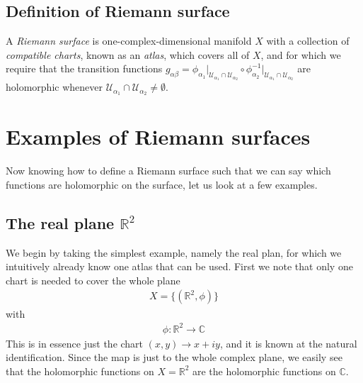 \documentclass[lettersize,11pt]{article}
\begin{document}
\subsection{Definition of Riemann surface \cite{Farkas}}
A \textit{Riemann surface} is one-complex-dimensional manifold $X$ with a collection of \textit{compatible charts}, known as an \textit{atlas}, which covers all of $X$, and for which we require that the transition functions $g_{\alpha\beta}=\phi_{\alpha_1}\big|_{\mathcal{U}_{\alpha_1}\cap \mathcal{U}_{\alpha_2}}\circ \phi_{\alpha_2}^{-1}\big|_{\mathcal{U}_{\alpha_1}\cap \mathcal{U}_{\alpha_2}}$ are holomorphic whenever $\mathcal{U}_{\alpha_1}\cap \mathcal{U}_{\alpha_2}\neq \emptyset$.
\section{Examples of Riemann surfaces}
Now knowing how to define a Riemann surface such that we can say which functions are holomorphic on the surface, let us look at a few examples.
\subsection{The real plane $\mathds{R}^2$}
We begin by taking the simplest example, namely the real plan, for which we intuitively already know one atlas that can be used. First we note that only one chart is needed to cover the whole plane
\begin{equation}
	\begin{aligned}
		X=\{(\mathds{R}^2,\phi)\}
	\end{aligned}
\end{equation}
with
\begin{equation}
	\begin{aligned}
		\phi: \mathds{R}^2\to \mathds{C}
	\end{aligned}
\end{equation}
This is in essence just the chart $(x,y)\to x+iy$, and it is known at the natural identification. Since the map is just to the whole complex plane, we easily see that the holomorphic functions on $X=\mathds{R}^2$ are the holomorphic functions on $\mathds{C}$.
\end{document}
